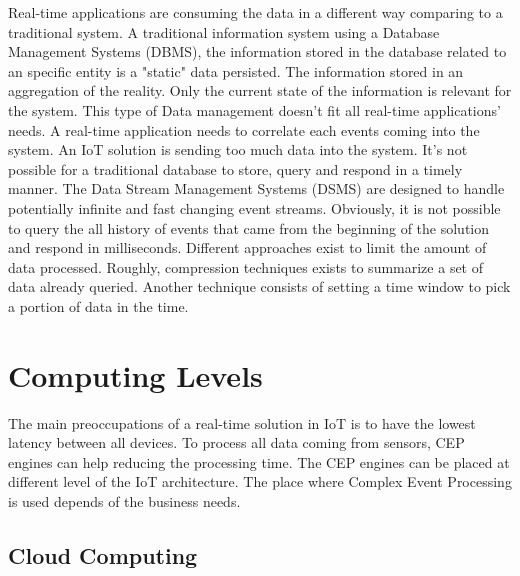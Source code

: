 \documentclass[11pt]{article}
\begin{document}
Real-time applications are consuming the data in a different way comparing to a traditional system. A traditional information system using a Database Management Systems (DBMS), the information stored in the database related to an specific entity is a "static" data persisted. The information stored in an aggregation of the reality. Only the current state of the information is relevant for the system. This type of Data management doesn't fit all real-time applications' needs. A real-time application needs to correlate each events coming into the system. An IoT solution is sending too much data into the system. It's not possible for a traditional database to store, query and respond in a timely manner. \cite{Complex-event-processing-for-the-Internet-of-Things}
\newline
\newline
The Data Stream Management Systems (DSMS) are designed to handle potentially infinite and fast changing event streams. Obviously, it is not possible to query the all history of events that came from the beginning of the solution and respond in milliseconds. Different approaches exist to limit the amount of data processed. Roughly, compression techniques exists to summarize a set of data already queried. Another technique consists of setting a time window to pick a portion of data in the time. 


\section{Computing Levels} \label{computing-levels}

The main preoccupations of a real-time solution in IoT is to have the lowest latency between all devices. To process all data coming from sensors, CEP engines can help reducing the processing time. The CEP engines can be placed at different level of the IoT architecture. The place where Complex Event Processing is used depends of the business needs. 


\subsection{Cloud Computing}
\end{document}
